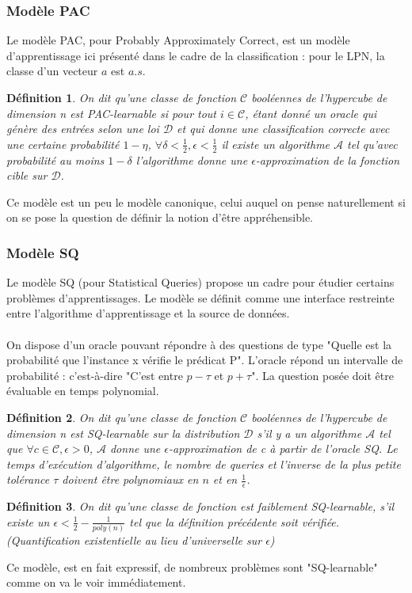 \documentclass{article}		%
\newtheorem{defi}{Définition}
\theoremstyle{definition}
\theoremstyle{plain}
\theoremstyle{plain}
\theoremstyle{plain}
\theoremstyle{plain}
\theoremstyle{plain}
\begin{document}
\subsubsection{Modèle PAC}
Le modèle PAC, pour Probably Approximately Correct, est un modèle
d'apprentissage ici présenté dans le cadre de la
classification : pour le LPN, la classe d'un vecteur $a$ est
$a.s$.
\begin{defi}
On dit qu'une classe de fonction $\mathcal{C}$ booléennes de l'hypercube
de dimension n est PAC-learnable si pour tout $i\in\mathcal{C}$, étant donné un oracle qui génère des
entrées
selon une loi $\mathcal{D}$ et qui donne une classification correcte avec une
certaine probabilité $1-\eta$, $\forall
\delta<\frac{1}{2}, \epsilon<\frac{1}{2}$ il existe un algorithme
$\mathcal{A}$ tel qu'avec probabilité au moins $1-\delta$ l'algorithme donne une
$\epsilon$-approximation de la fonction cible sur $\mathcal{D}$. 
\end{defi}
Ce modèle est un peu le modèle canonique, celui auquel on pense
naturellement si on se pose la question de définir la notion d'être
appréhensible.
\subsubsection{Modèle SQ}
Le modèle SQ (pour Statistical Queries) propose un cadre pour étudier
certains problèmes d'apprentissages. Le modèle se définit comme une
interface restreinte entre l'algorithme d'apprentissage et la source de
données.
\\
\\
On dispose d'un oracle pouvant répondre à des questions de type "Quelle
est la probabilité que l'instance x vérifie le prédicat P". L'oracle
répond un intervalle de probabilité : c'est-à-dire "C'est entre
$p - \tau$ et $p + \tau$". La question posée doit être évaluable
en temps polynomial.
\\
\begin{defi}
On dit qu'une classe de fonction $\mathcal{C}$ booléennes de l'hypercube
de dimension n est SQ-learnable sur la
distribution $\mathcal{D}$ s'il y a un algorithme $\mathcal{A}$
tel que $\forall c \in \mathcal{C}, \epsilon>0$, $\mathcal{A}$ donne une
$\epsilon$-approximation de c à partir de l'oracle SQ. Le temps
d'exécution d'algorithme, le nombre de queries et l'inverse de la plus
petite tolérance $\tau$ doivent être polynomiaux en $n$ et en
$\frac{1}{\epsilon}$. 
\end{defi}
\begin{defi}
On dit qu'une classe de fonction est faiblement SQ-learnable, s'il existe
un $\epsilon<\frac{1}{2}-\frac{1}{poly(n)}$ tel que la définition
précédente soit vérifiée.(Quantification existentielle au lieu
d'universelle sur $\epsilon$) 
\end{defi}
Ce modèle, est en fait expressif, de nombreux problèmes sont
"SQ-learnable" comme on va le voir immédiatement.
\end{document}
